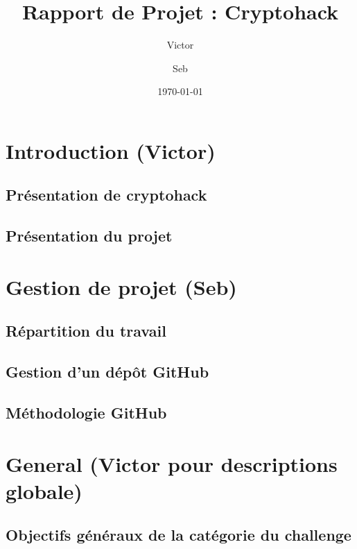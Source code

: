 \documentclass[12pt, a4paper]{article}
\title{Rapport de Projet : Cryptohack}
\author{Victor \and Seb}
\date{\today} %
\begin{document}
\maketitle

\tableofcontents

\newpage %


\section{Introduction (Victor)}
    \subsection{Présentation de cryptohack}
    
    \subsection{Présentation du projet}

\section{Gestion de projet (Seb)}
    \subsection{Répartition du travail}
    
    \subsection{Gestion d'un dépôt GitHub}
    
    \subsection{Méthodologie GitHub}

\section{General (Victor pour descriptions globale)}
    \subsection{Objectifs généraux de la catégorie du challenge}
    
\end{document}
